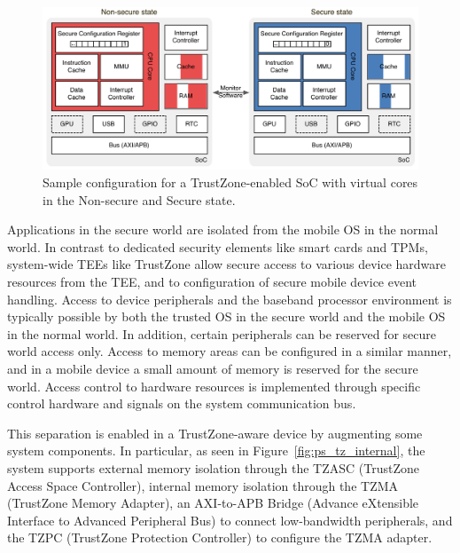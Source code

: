 \begin{figure}[!ht]
    \centering
    \includegraphics[width=1\linewidth]{figures/phonesecures/tee_tz_cores}
    \caption[TrustZone-enabled SoC cores in Non-secure and Secure states]{Sample configuration for a TrustZone-enabled SoC with virtual cores in the Non-secure and Secure state.}
    \label{fig:ps_tz_cores}
\end{figure}

Applications in the secure world are isolated from the mobile OS in the normal
world. In contrast to dedicated security elements like smart cards and TPMs,
system-wide TEEs like TrustZone allow secure access to various device hardware
resources from the TEE, and to configuration of secure mobile device event
handling. Access to device peripherals and the baseband processor environment
is typically possible by both the trusted OS in the secure world and the mobile
OS in the normal world. In addition, certain peripherals can be reserved for
secure world access only. Access to memory areas can be configured in a similar
manner, and in a mobile device a small amount of memory is reserved for the
secure world. Access control to hardware resources is implemented through
specific control hardware and signals on the system communication bus.

This separation is enabled in a TrustZone-aware device by augmenting some system components. In particular, as seen in Figure~\ref{fig:ps_tz_internal}, the system supports external memory isolation through the TZASC (TrustZone Access Space Controller), internal memory isolation through the TZMA (TrustZone Memory Adapter), an AXI-to-APB Bridge (Advance eXtensible Interface to Advanced Peripheral Bus) to connect low-bandwidth peripherals, and the TZPC (TrustZone Protection Controller) to configure the TZMA adapter.

